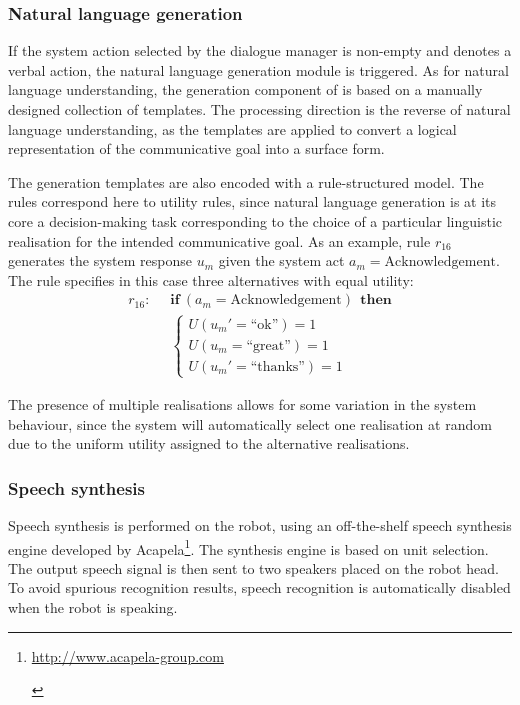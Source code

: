 \subsubsection*{Natural language generation}

If the system action selected by the dialogue manager is non-empty and denotes a verbal action, the natural language generation module is triggered.  As for natural language understanding, the generation component of \opendial{} is based on a manually designed collection of templates.  The processing direction is the reverse of natural language understanding, as the templates are applied to convert a logical representation of the communicative goal into a surface form. 

The generation templates are also encoded with a rule-structured model.  The rules correspond here to utility rules, since natural language generation is at its core a decision-making task corresponding to the choice of a particular linguistic realisation for the intended communicative goal.  As an example, rule $r_{16}$ generates the system response $u_m$ given the system act $a_m=\mathrm{Acknowledgement}$.  The rule specifies in this case three alternatives with equal utility:
\begin{align*}
r_{16}: &\;\;\textbf{if} \ (a_m = \mathrm{Acknowledgement} )  \ \ \textbf{then} \\ 
& \;\; \begin{cases} U(u_m'=\text{``ok''}) = 1 \\ U(u_m=\text{``great''}) = 1 \\ U(u_m'=\text{``thanks''}) = 1 \end{cases}
\end{align*}

The presence of multiple realisations allows for some variation in the system behaviour, since the system will automatically select one realisation at random due to the uniform utility assigned to the alternative realisations.

\subsubsection*{Speech synthesis}

Speech synthesis is performed on the robot, using an off-the-shelf speech synthesis engine developed by Acapela\footnote{\begin{scriptsize}\url{http://www.acapela-group.com}\end{scriptsize}}. The synthesis engine is based on unit selection. The output speech signal is then sent to two speakers placed on the robot head. To avoid spurious recognition results, speech recognition is automatically disabled when the robot is speaking.  
 
